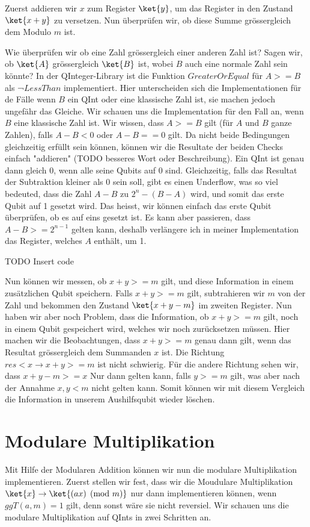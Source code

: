 Zuerst addieren wir $x$ zum Register $\ket{y}$, um das Register in den Zustand $\ket{x + y}$ zu versetzen. Nun überprüfen wir, ob diese Summe grössergleich dem Modulo $m$ ist. 

Wie überprüfen wir ob eine Zahl grössergleich einer anderen Zahl ist? Sagen wir, ob $\ket{A}$ grössergleich $\ket{B}$ ist, wobei $B$ auch eine normale Zahl sein könnte? In der QInteger-Library ist die Funktion $GreaterOrEqual$ für $A >= B$ als ¬$LessThan$ implementiert. Hier unterscheiden sich die Implementationen für de Fälle wenn $B$ ein QInt oder eine klassische Zahl ist, sie machen jedoch ungefähr das Gleiche. Wir schauen uns die Implementation für den Fall an, wenn $B$ eine klassische Zahl ist. Wir wissen, dass $A >= B$ gilt (für $A$ und $B$ ganze Zahlen), falls $A - B < 0$ oder $A - B == 0$ gilt. Da nicht beide Bedingungen gleichzeitig erfüllt sein können, können wir die Resultate der beiden Checks einfach "addieren" (TODO besseres Wort oder Beschreibung). Ein QInt ist genau dann gleich 0, wenn alle seine Qubits auf 0 sind. Gleichzeitig, falls das Resultat der Subtraktion kleiner als $0$ sein soll, gibt es einen Underflow, was so viel bedeuted, dass die Zahl $A - B$ zu $2^n - (B - A)$ wird, und somit das erste Qubit auf 1 gesetzt wird. Das heisst, wir können einfach das erste Qubit überprüfen, ob es auf eins gesetzt ist. Es kann aber passieren, dass $A - B >= 2^{n - 1}$ gelten kann, deshalb verlängere ich in meiner Implementation das Register, welches $A$ enthält, um 1.

TODO Insert code

Nun können wir messen, ob $x + y >= m$ gilt, und diese Information in einem zusätzlichen Qubit speichern. Falls $x + y >= m$ gilt, subtrahieren wir $m$ von der Zahl und bekommen den Zustand $\ket{x + y - m}$ im zweiten Register. Nun haben wir aber noch Problem, dass die Information, ob $x + y >= m$ gilt, noch in einem Qubit gespeichert wird, welches wir noch zurücksetzen müssen. Hier machen wir die Beobachtungen, dass $x + y >= m$ genau dann gilt, wenn das Resultat grössergleich dem Summanden $x$ ist. Die Richtung $res < x \rightarrow x + y >= m$ ist nicht schwierig. Für die andere Richtung sehen wir, dass $x + y - m >= x$ Nur dann gelten kann, falls $y >= m$ gilt, was aber nach der Annahme $x, y < m$ nicht gelten kann. Somit können wir mit diesem Vergleich die Information in unserem Aushilfsqubit wieder löschen.

\section{Modulare Multiplikation}
Mit Hilfe der Modularen Addition können wir nun die modulare Multiplikation implementieren. Zuerst stellen wir fest, dass wir die Moudulare Multiplikation $\ket{x} \rightarrow \ket{(ax) \pmod{m}}$ nur dann implementieren können, wenn $ggT(a, m) = 1$ gilt, denn sonst wäre sie nicht reversiel. \newline
Wir schauen uns die modulare Multiplikation auf QInts in zwei Schritten an.

